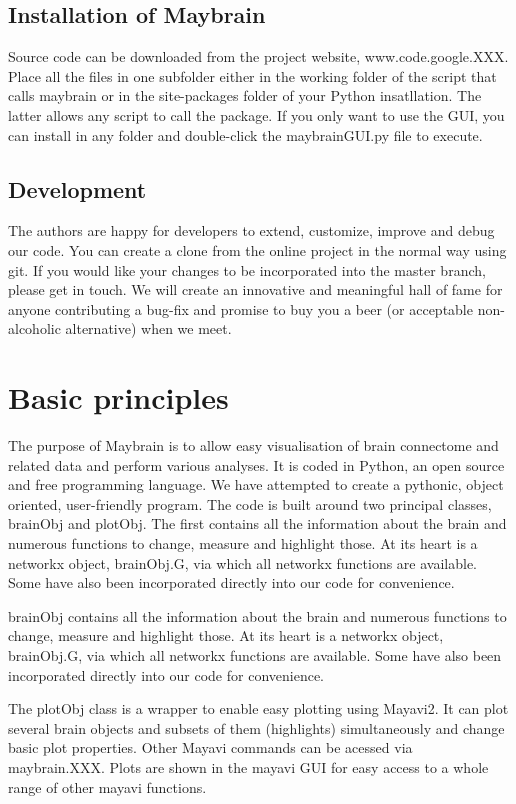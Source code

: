 \documentclass{report}
\begin{document}
\subsection{Installation of Maybrain}
Source code can be downloaded from the project website, www.code.google.XXX. Place all the files in one subfolder either in the working folder of the script that calls maybrain or in the site-packages folder of your Python insatllation. The latter allows any script to call the package. If you only want to use the GUI, you can install in any folder and double-click the maybrainGUI.py file to execute.

\subsection{Development}
The authors are happy for developers to extend, customize, improve and debug our code. You can create a clone from the online project in the normal way using git. If you would like your changes to be incorporated into the master branch, please get in touch. We will create an innovative and meaningful hall of fame for anyone contributing a bug-fix and promise to buy you a beer (or acceptable non-alcoholic alternative) when we meet.



\section{Basic principles}
The purpose of Maybrain is to allow easy visualisation of brain connectome and related data and perform various analyses. It is coded in Python, an open source and free programming language. We have attempted to create a pythonic, object oriented, user-friendly program. The code is built around two principal classes, brainObj and plotObj. The first contains all the information about the brain and numerous functions to change, measure and highlight those. At its heart is a networkx object, brainObj.G, via which all networkx functions are available. Some have also been incorporated directly into our code for convenience. 

brainObj contains all the information about the brain and numerous functions to change, measure and highlight those. At its heart is a networkx object, brainObj.G, via which all networkx functions are available. Some have also been incorporated directly into our code for convenience. 

The plotObj class is a wrapper to enable easy plotting using Mayavi2. It can plot several brain objects and subsets of them (highlights) simultaneously and change basic plot properties. Other Mayavi commands can be acessed via maybrain.XXX. Plots are shown in the mayavi GUI for easy access to a whole range of other mayavi functions.
\end{document}
